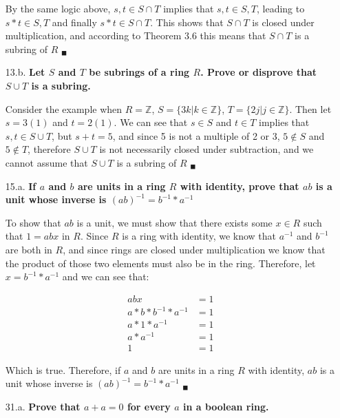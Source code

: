 \documentclass{article}
\begin{document}
\begin{enumerate}
			By the same logic above, $s, t \in S \cap T$ implies that $s, t \in S, T$, leading to 
			$s * t \in S, T$ and finally $s * t \in S \cap T$. This shows that $S \cap T$ is closed
			under multiplication, and according to Theorem 3.6 this means that $S \cap T$ is a 
			subring of $R$ $_{\blacksquare}$

		\item [13.b.] \textbf{Let $S$ and $T$ be subrings of a ring $R$. Prove or disprove that 
				$S \cup T$ is a subring.}

			Consider the example when $R = \mathbb{Z}$, $S = \lbrace 3k | k \in \mathbb{Z} \rbrace$,
			$T = \lbrace 2j | j \in \mathbb{Z} \rbrace$. Then let $s = 3(1)$ and $t = 2(1)$. We can
			see that $s \in S$ and $t \in T$ implies that $s, t \in S \cup T$, but $s + t = 5$, and
			since 5 is not a multiple of 2 or 3, $5 \not \in S$ and $5 \not \in T$, therefore $S
			\cup T$ is not necessarily closed under subtraction, and we cannot assume that $S \cup 
			T$ is a subring of $R$ $_{\blacksquare}$

		\item [15.a.] \textbf{If $a$ and $b$ are units in a ring $R$ with identity, prove that $ab$
				is a unit whose inverse is $(ab)^{-1} = b^{-1} * a^{-1}$}

			To show that $ab$ is a unit, we must show that there exists some $x \in R$ such that 
			$1 = abx$ in $R$. Since $R$ is a ring with identity, we know that $a^{-1}$ and $b^{-1}$ 
			are both in $R$, and since rings are closed under multiplication we know that the 
			product of those two elements must also be in the ring. Therefore, let 
			$x = b^{-1} * a^{-1}$ and we can see that:

			\begin{align*}
				abx & = 1 \\
				a * b * b^{-1} * a^{-1} & = 1 \\
				a * 1 * a^{-1} & = 1 \\
				a * a^{-1} & = 1 \\
				1 & = 1
			\end{align*}

			Which is true. Therefore, if $a$ and $b$ are units in a ring $R$ with identity, $ab$ is 
			a unit whose inverse is $(ab)^{-1} = b^{-1} * a^{-1}$ $_{\blacksquare}$

		\item [31.a.] \textbf{Prove that $a + a = 0$ for every $a$ in a boolean ring.}


\end{enumerate}
\end{document}
